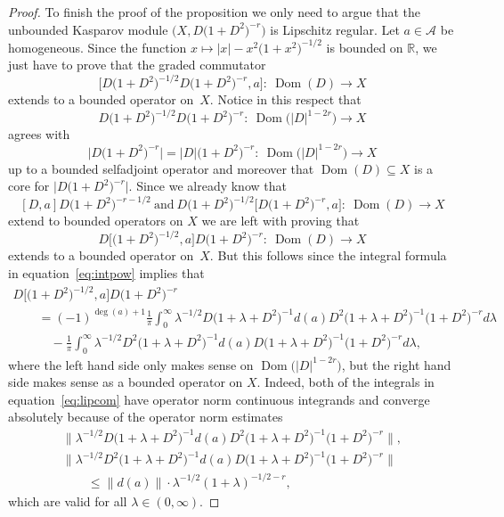\documentclass[11pt]{article}
\numberwithin{equation}{section}
\newcommand{\cd}{\cdot}
\newcommand{\la}{\lambda}
\newcommand{\s}[1]{\mathscr{#1}}
\newcommand{\B}[1]{\mathbb{#1}}
\newcommand{\su}{\subseteq}
\begin{document}
\begin{proof}
To finish the proof of the proposition we only need to argue that the unbounded Kasparov module $\big(X,D\big(1 + D^2\big)^{-r}\big)$ is Lipschitz regular. Let $a \in \s A$ be homogeneous. Since the function $x \mapsto |x| - x^2 \big(1 + x^2\big)^{-1/2}$ is bounded on $\B R$, we just have to prove that the graded commutator
\[
\big[ D\big(1 + D^2\big)^{-1/2} D\big(1 + D^2\big)^{-r}, a \big]\colon \ \operatorname{Dom}(D) \to X
\]
extends to a bounded operator on~$X$. Notice in this respect that
\[ D\big(1 + D^2\big)^{-1/2} D\big(1 + D^2\big)^{-r}\colon \ \operatorname{Dom}\big(|D|^{1 - 2r}\big) \to X\] agrees with
\[ \big|D\big(1 + D^2\big)^{-r}\big| = |D|\big(1 + D^2\big)^{-r}\colon \ \operatorname{Dom}\big(|D|^{1-2r}\big) \to X\] up to a bounded selfadjoint operator and moreover that $\operatorname{Dom}(D) \su X$ is a core for $\big|D \big(1 + D^2\big)^{-r}\big|$. Since we already know that
\[
[D,a] D \big(1 + D^2\big)^{-r - 1/2} \ \text{and} \ D\big(1 + D^2\big)^{-1/2} \big[D\big(1 + D^2\big)^{-r}, a\big]\colon \ \operatorname{Dom}(D) \to X
\]
extend to bounded operators on $X$ we are left with proving that
\[
D \big[ \big(1 + D^2\big)^{-1/2}, a\big] D\big(1 + D^2\big)^{-r}\colon \ \operatorname{Dom}(D) \to X
\]
extends to a bounded operator on~$X$. But this follows since the integral formula in equation~\eqref{eq:intpow} implies that
\begin{gather}
 D \big[ \big(1 + D^2\big)^{-1/2}, a\big] D\big(1 + D^2\big)^{-r} \nonumber\\
\qquad{} = (-1)^{\deg (a) + 1} \frac{1}{\pi} \int_0^\infty \la^{-1/2} D \big(1 + \la + D^2\big)^{-1} d(a) D^2 \big(1 + \la + D^2\big)^{-1} \big(1 + D^2\big)^{-r} d\la \nonumber\\
\qquad\quad{}-\frac{1}{\pi} \int_0^\infty \la^{-1/2} D^2 \big(1 + \la + D^2\big)^{-1} d(a) D\big(1 + \la + D^2\big)^{-1}\big(1 + D^2\big)^{-r} d\la ,\label{eq:lipcom}
\end{gather}
where the left hand side only makes sense on $\operatorname{Dom}\big(|D|^{1-2r}\big)$, but the right hand side makes sense as a bounded operator on $X$. Indeed, both of the integrals in equation~\eqref{eq:lipcom} have operator norm continuous integrands and converge absolutely because of the operator norm estimates
\begin{gather*}
 \big\| \la^{-1/2} D \big(1 + \la + D^2\big)^{-1} d(a) D^2 \big(1 + \la + D^2\big)^{-1} \big(1 + D^2\big)^{-r} \big\| , \\
 \big\| \la^{-1/2} D^2 \big(1 + \la + D^2\big)^{-1} d(a) D\big(1 + \la + D^2\big)^{-1}\big(1 + D^2\big)^{-r} \big\| \\
 \qquad{} \leq \| d(a) \| \cd \la^{-1/2} (1 + \la)^{-1/2 - r} ,
\end{gather*}
which are valid for all $\la \in (0,\infty)$.
\end{proof}
\end{document}
